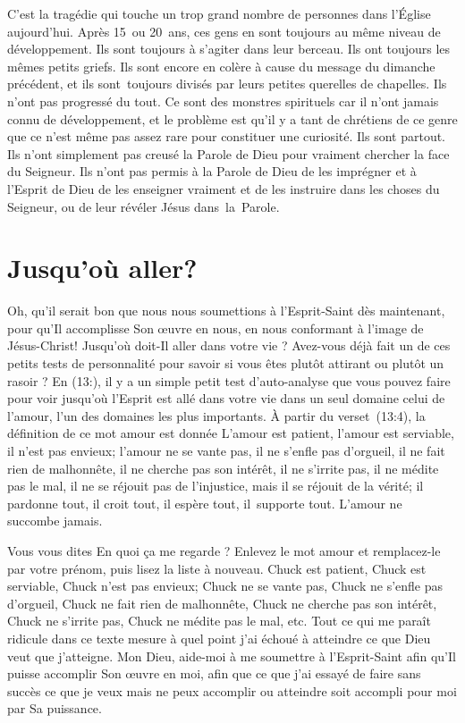 C'est la tragédie qui touche un trop grand nombre de personnes
 dans l'Église aujourd'hui. Après 15~ou 20~ans,
 ces gens en sont toujours au même niveau de développement.
 Ils sont toujours à s'agiter dans leur berceau.
 Ils ont toujours les mêmes petits griefs.
 Ils sont encore en colère à cause du message du dimanche précédent,
 et ils sont~toujours divisés par leurs petites querelles de chapelles.
 Ils n'ont pas progressé du tout. Ce sont des monstres spirituels
 car il n'ont jamais connu de développement, et le problème est qu'il y a
 tant de chrétiens de ce genre que ce n'est même pas assez rare pour constituer une curiosité.
 Ils sont partout. Ils n'ont simplement pas creusé la Parole de Dieu
 pour vraiment chercher la face du Seigneur. Ils n'ont pas permis à la Parole de Dieu
 de les imprégner et à l'Esprit de Dieu de les enseigner vraiment et
 de les instruire dans les choses du Seigneur,
 ou de leur révéler Jésus dans~la~Parole.


\section{Jusqu'o\`u aller?}

Oh, qu'il serait bon que nous nous soumettions à l'Esprit-Saint
 dès maintenant, pour qu'Il accomplisse Son œuvre en nous,
 en nous conformant à l'image de Jésus-Christ!
 Jusqu'où doit-Il aller dans votre vie ?
 Avez-vous déjà fait un de ces petits tests de personnalité pour savoir
 si vous êtes plutôt attirant ou plutôt un rasoir ?
 En (13:), il y a un simple petit test d'auto-analyse
 que vous pouvez faire pour voir jusqu'où l'Esprit est allé
 dans votre vie dans un seul domaine\frcolon{} celui de l'amour,
 l'un des domaines les plus importants.
 À partir du verset~(13:4), la définition
 de ce mot \Og amour \Fg{} est donnée\frcolon{}
 \Og L'amour est patient, l'amour est serviable, il n'est pas envieux;
 l'amour ne se vante pas, il ne s'enfle pas d'orgueil,
 il ne fait rien de malhonnête, il ne cherche pas son intérêt,
 il ne s'irrite pas, il ne médite pas le mal, il ne se réjouit pas
 de l'injustice, mais il se réjouit de la vérité; il pardonne tout,
 il croit tout, il espère tout, il~supporte tout.
 L'amour ne succombe jamais. \Fg{}

Vous vous dites\frcolon{}
 \Og En quoi ça me regarde ? \Fg{}
 Enlevez le mot \Og amour \Fg{} et remplacez-le par votre prénom,
 puis lisez la liste à nouveau.
 \Og Chuck est patient, Chuck est serviable, Chuck n'est pas envieux;
 Chuck ne se vante pas, Chuck ne s'enfle pas d'orgueil, Chuck ne fait rien
 de malhonnête, Chuck ne cherche pas son intérêt, Chuck ne s'irrite pas,
 Chuck ne médite pas le mal, etc. \Fg{}
 Tout ce qui me paraît ridicule dans ce texte mesure à quel point j'ai échoué
 à atteindre ce que Dieu veut que j'atteigne.
 Mon Dieu, aide-moi à me soumettre à l'Esprit-Saint afin qu'Il puisse accomplir
 Son œuvre en moi, afin que ce que j'ai essayé de faire sans succès
 \ocadr ce que je veux mais ne peux accomplir ou atteindre \fcadr
 soit accompli pour moi par Sa puissance.
\closechapter
